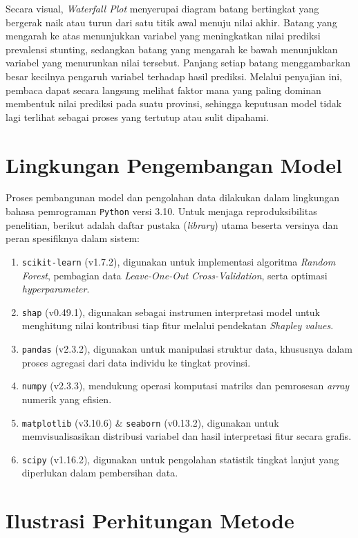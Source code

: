 Secara visual, \textit{Waterfall Plot} menyerupai diagram batang bertingkat yang bergerak naik atau turun dari satu titik awal menuju nilai akhir. Batang yang mengarah ke atas menunjukkan variabel yang meningkatkan nilai prediksi prevalensi stunting, sedangkan batang yang mengarah ke bawah menunjukkan variabel yang menurunkan nilai tersebut. Panjang setiap batang menggambarkan besar kecilnya pengaruh variabel terhadap hasil prediksi. Melalui penyajian ini, pembaca dapat secara langsung melihat faktor mana yang paling dominan membentuk nilai prediksi pada suatu provinsi, sehingga keputusan model tidak lagi terlihat sebagai proses yang tertutup atau sulit dipahami.

\section{Lingkungan Pengembangan Model}
Proses pembangunan model dan pengolahan data dilakukan dalam lingkungan bahasa pemrograman \texttt{Python} versi 3.10. Untuk menjaga reproduksibilitas penelitian, berikut adalah daftar pustaka (\textit{library}) utama beserta versinya dan peran spesifiknya dalam sistem:

\begin{enumerate}
    \item \texttt{scikit-learn} (v1.7.2), digunakan untuk implementasi algoritma \textit{Random Forest}, pembagian data \textit{Leave-One-Out Cross-Validation}, serta optimasi \textit{hyperparameter}.
    \item \texttt{shap} (v0.49.1), digunakan sebagai instrumen interpretasi model untuk menghitung nilai kontribusi tiap fitur melalui pendekatan \textit{Shapley values}.
    \item \texttt{pandas} (v2.3.2), digunakan untuk manipulasi struktur data, khususnya dalam proses agregasi dari data individu ke tingkat provinsi.
    \item \texttt{numpy} (v2.3.3), mendukung operasi komputasi matriks dan pemrosesan \textit{array} numerik yang efisien.
    \item \texttt{matplotlib} (v3.10.6) \& \texttt{seaborn} (v0.13.2), digunakan untuk memvisualisasikan distribusi variabel dan hasil interpretasi fitur secara grafis.
    \item \texttt{scipy} (v1.16.2), digunakan untuk pengolahan statistik tingkat lanjut yang diperlukan dalam pembersihan data.
\end{enumerate}

\section{Ilustrasi Perhitungan Metode} \label{sec:ilustrasi_metode}

